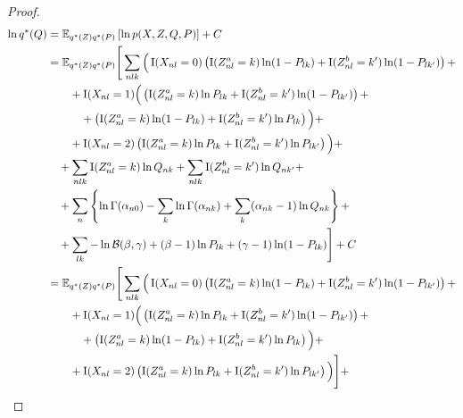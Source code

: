 \begin{proof}
\begin{align*}
\ln \StarProb{Q} &= \Exp{\StarProb{Z} \StarProb{P}}{\ln \TrueProb{X, Z, Q, P}} + C
\\ %
	&= \mathbb{E}_{\StarProb{Z} \StarProb{P}} \Bigg[ \sum_{nlk} \Big( \Big.
		\Indic{X_{nl} = 0} \left( \Indic{Z_{nl}^a = k} \ln (1 - P_{lk})
				+ \Indic{Z_{nl}^b = k'} \ln (1 - P_{lk'}) \right) +												\nonumber \\
			& \qquad + \Indic{X_{nl} = 1} \Big(
				\left( \Indic{Z_{nl}^a=k} \ln P_{lk} + \Indic{Z_{nl}^b=k'} \ln (1 - P_{lk'}) \right) +			\nonumber \\
			& \qquad \quad + \left( \Indic{Z_{nl}^a=k} \ln (1 - P_{lk}) + \Indic{Z_{nl}^b=k'} \ln P_{lk} \right)
			\Big) +																								\nonumber \\
			& \qquad + \Indic{X_{nl} = 2} \left( \Indic{Z_{nl}^a = k} \ln P_{lk}
				+ \Indic{Z_{nl}^b = k'} \ln P_{lk'} \right)
	\Big. \Big) +
\nonumber \\ %
		& \quad + \sum_{nlk} \Indic{Z_{nl}^a = k} \ln Q_{nk}
			+ \sum_{nlk} \Indic{Z_{nl}^b = k'} \ln Q_{nk'} +
\nonumber \\ %
		& \quad + \sum_n \left\{
			\ln \GammaFunc{\alpha_{n0}}
			- \sum_{k} \ln \GammaFunc{\alpha_{nk}}
			+ \sum_{k} (\alpha_{nk} - 1) \ln Q_{nk}
		\right\} +
\nonumber \\ %
		& \quad + \sum_{lk} - \ln \BetaFunc{\beta}{\gamma}
		+ (\beta - 1) \ln P_{lk}
		+ (\gamma - 1) \ln (1 - P_{lk})
	\Bigg] + C
\\ %
	&= \mathbb{E}_{\StarProb{Z} \StarProb{P}} \Bigg[ \sum_{nlk} \Big( \Big.
		\Indic{X_{nl} = 0} \left( \Indic{Z_{nl}^a = k} \ln (1 - P_{lk})
				+ \Indic{Z_{nl}^b = k'} \ln (1 - P_{lk'}) \right) +												\nonumber \\
			& \qquad + \Indic{X_{nl} = 1} \Big(
				\left( \Indic{Z_{nl}^a=k} \ln P_{lk} + \Indic{Z_{nl}^b=k'} \ln (1 - P_{lk'}) \right) +			\nonumber \\
			& \qquad \quad + \left( \Indic{Z_{nl}^a=k} \ln (1 - P_{lk}) + \Indic{Z_{nl}^b=k'} \ln P_{lk} \right)
			\Big) +																								\nonumber \\
			& \qquad + \Indic{X_{nl} = 2} \left( \Indic{Z_{nl}^a = k} \ln P_{lk}
				+ \Indic{Z_{nl}^b = k'} \ln P_{lk'} \right)
	\Big. \Big) \Bigg] +
\nonumber \\ %

\end{align*}
\end{proof}
